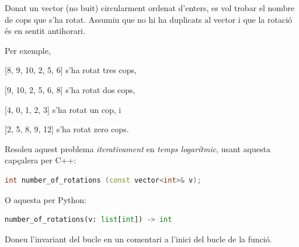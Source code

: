 

\Statement

Donat un vector (no buit) circularment ordenat d'enters,
es vol trobar el nombre de cops que s'ha rotat.
Assumiu que no hi ha duplicats al vector
i que la rotació és en sentit antihorari.

\medskip

Per exemple,
\begin{itemize*}
\item {} [8, 9, 10, 2, 5, 6] s'ha rotat tres cops,
\item {} [9, 10, 2, 5, 6, 8] s'ha rotat dos cops,
\item {} [4, 0, 1, 2, 3] s'ha rotat un cop, i
\item {} [2, 5, 8, 9, 12] s'ha rotat zero cops.
\end{itemize*}

\medskip

Resoleu aquest problema \emph{iterativament} en \emph{temps logarítmic},
usant aquesta capçalera per C++:

\begin{lstlisting}[language=C++,morekeywords={string,vector}]
    int number_of_rotations (const vector<int>& v);
\end{lstlisting}

O aquesta per Python:

\begin{lstlisting}[language=Python]
    number_of_rotations(v: list[int]) -> int
\end{lstlisting}


\medskip

Doneu l'invariant del bucle en un comentari a l'inici del bucle de la funció.

\ObservationNoMain
